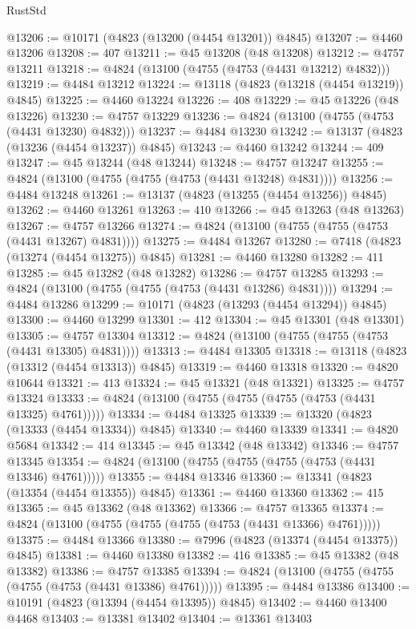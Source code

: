 \begin{lexlean}{RustStd}
\begin{coremodule}
@13206 := @10171 (@4823 (@13200 (@4454 @13201)) @4845)
@13207 := @4460 @13206
@13208 := 407
@13211 := @45 @13208 (@48 @13208)
@13212 := @4757 @13211
@13218 := @4824 (@13100 (@4755 (@4753 (@4431 @13212) @4832)))
@13219 := @4484 @13212
@13224 := @13118 (@4823 (@13218 (@4454 @13219)) @4845)
@13225 := @4460 @13224
@13226 := 408
@13229 := @45 @13226 (@48 @13226)
@13230 := @4757 @13229
@13236 := @4824 (@13100 (@4755 (@4753 (@4431 @13230) @4832)))
@13237 := @4484 @13230
@13242 := @13137 (@4823 (@13236 (@4454 @13237)) @4845)
@13243 := @4460 @13242
@13244 := 409
@13247 := @45 @13244 (@48 @13244)
@13248 := @4757 @13247
@13255 := @4824 (@13100 (@4755 (@4755 (@4753 (@4431 @13248) @4831))))
@13256 := @4484 @13248
@13261 := @13137 (@4823 (@13255 (@4454 @13256)) @4845)
@13262 := @4460 @13261
@13263 := 410
@13266 := @45 @13263 (@48 @13263)
@13267 := @4757 @13266
@13274 := @4824 (@13100 (@4755 (@4755 (@4753 (@4431 @13267) @4831))))
@13275 := @4484 @13267
@13280 := @7418 (@4823 (@13274 (@4454 @13275)) @4845)
@13281 := @4460 @13280
@13282 := 411
@13285 := @45 @13282 (@48 @13282)
@13286 := @4757 @13285
@13293 := @4824 (@13100 (@4755 (@4755 (@4753 (@4431 @13286) @4831))))
@13294 := @4484 @13286
@13299 := @10171 (@4823 (@13293 (@4454 @13294)) @4845)
@13300 := @4460 @13299
@13301 := 412
@13304 := @45 @13301 (@48 @13301)
@13305 := @4757 @13304
@13312 := @4824 (@13100 (@4755 (@4755 (@4753 (@4431 @13305) @4831))))
@13313 := @4484 @13305
@13318 := @13118 (@4823 (@13312 (@4454 @13313)) @4845)
@13319 := @4460 @13318
@13320 := @4820 @10644
@13321 := 413
@13324 := @45 @13321 (@48 @13321)
@13325 := @4757 @13324
@13333 := @4824 (@13100 (@4755 (@4755 (@4755 (@4753 (@4431 @13325) @4761)))))
@13334 := @4484 @13325
@13339 := @13320 (@4823 (@13333 (@4454 @13334)) @4845)
@13340 := @4460 @13339
@13341 := @4820 @5684
@13342 := 414
@13345 := @45 @13342 (@48 @13342)
@13346 := @4757 @13345
@13354 := @4824 (@13100 (@4755 (@4755 (@4755 (@4753 (@4431 @13346) @4761)))))
@13355 := @4484 @13346
@13360 := @13341 (@4823 (@13354 (@4454 @13355)) @4845)
@13361 := @4460 @13360
@13362 := 415
@13365 := @45 @13362 (@48 @13362)
@13366 := @4757 @13365
@13374 := @4824 (@13100 (@4755 (@4755 (@4755 (@4753 (@4431 @13366) @4761)))))
@13375 := @4484 @13366
@13380 := @7996 (@4823 (@13374 (@4454 @13375)) @4845)
@13381 := @4460 @13380
@13382 := 416
@13385 := @45 @13382 (@48 @13382)
@13386 := @4757 @13385
@13394 := @4824 (@13100 (@4755 (@4755 (@4755 (@4753 (@4431 @13386) @4761)))))
@13395 := @4484 @13386
@13400 := @10191 (@4823 (@13394 (@4454 @13395)) @4845)
@13402 := @4460 @13400 @4468
@13403 := @13381 @13402
@13404 := @13361 @13403

\end{coremodule}
\end{lexlean}
